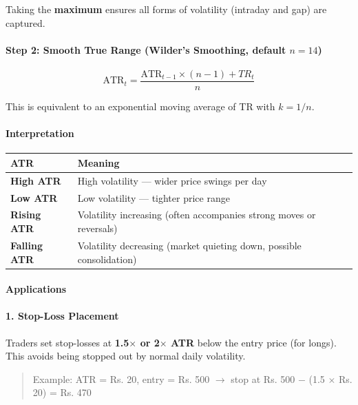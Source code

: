 \documentclass[12pt,openany]{book}
\begin{document}
Taking the \textbf{maximum} ensures all forms of volatility (intraday and gap) are captured.

\paragraph{Step 2: Smooth True Range (Wilder's Smoothing, default \(n = 14\))}

\[
\text{ATR}_t = \frac{\text{ATR}_{t-1} \times (n - 1) + TR_t}{n}
\]

This is equivalent to an exponential moving average of TR with \(k = 1/n\).

\paragraph{Interpretation}

\begin{center}
\small
\renewcommand{\arraystretch}{1.2}
\begin{tabular}{|L{0.30\textwidth}|L{0.60\textwidth}|}
\hline
 \textbf{ATR} & \textbf{Meaning} \\ \hline
 \textbf{High ATR} & High volatility --- wider price swings per day \\ \hline
 \textbf{Low ATR} & Low volatility --- tighter price range \\ \hline
 \textbf{Rising ATR} & Volatility increasing (often accompanies strong moves or reversals) \\ \hline
 \textbf{Falling ATR} & Volatility decreasing (market quieting down, possible consolidation) \\ \hline
\end{tabular}
\end{center}

\paragraph{Applications}

\paragraph{1. Stop-Loss Placement}
Traders set stop-losses at \textbf{1.5\(\times\) or 2\(\times\) ATR} below the entry price (for longs). This avoids being stopped out by normal daily volatility.

\begin{quote}
Example: ATR = Rs. 20, entry = Rs. 500 \(\rightarrow\) stop at Rs. 500 \(-\) (1.5 \(\times\) Rs. 20) = Rs. 470

\end{quote}
\end{document}
